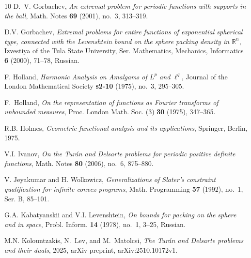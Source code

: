 \documentclass[[a4paper,english,12pt]{amsart}
\theoremstyle{plain}
\theoremstyle{remark}
\begin{document}
\begin{thebibliography}{10}
D.~V. Gorbachev, \emph{An extremal problem for periodic functions with supports
  in the ball}, Math. Notes \textbf{69} (2001), no.~3, 313--319.

D.V. Gorbachev, \emph{Extremal problems for entire functions of exponential
  spherical type, connected with the {L}evenshtein bound on the sphere packing
  density in $\mathbb{R}^n$}, Izvestiya of the Tula State University, Ser.
  Mathematics, Mechanics, Informatics \textbf{6} (2000), 71--78, Russian.



F. Holland,
\emph{Harmonic Analysis on Amalgams of $L^p$ and $\ell^q$},
Journal of the London Mathematical Society \textbf{s2-10} (1975), no.~3, 295--305.


F.~Holland, \emph{On the representation of functions as {F}ourier transforms of
  unbounded measures}, Proc. London Math. Soc. (3) \textbf{30} (1975),
  347--365.


R.B. Holmes, \emph{Geometric functional analysis and its applications},
  Springer, Berlin, 1975.

V.I. Ivanov, \emph{On the {T}urán and {D}elsarte problems for periodic
  positive definite functions}, Math. Notes \textbf{80} (2006), no.~6,
  875--880.



V. Jeyakumar and H. Wolkowicz, \emph{Generalizations of {S}later's constraint qualification for infinite convex programs}, Math. Programming {\bf 57} (1992), no.~1, Ser. B, 85--101.

G.A. Kabatyanskii and V.I. Levenshtein, \emph{On bounds for packing on the
  sphere and in space}, Probl. Inform. \textbf{14} (1978), no.~1, 3--25,
  Russian.

M.N. Kolountzakis, N.~Lev, and M.~Matolcsi, \emph{The {T}urán and {D}elsarte
  problems and their duals}, 2025, arXiv preprint, arXiv:2510.10172v1.


\end{thebibliography}
\end{document}
